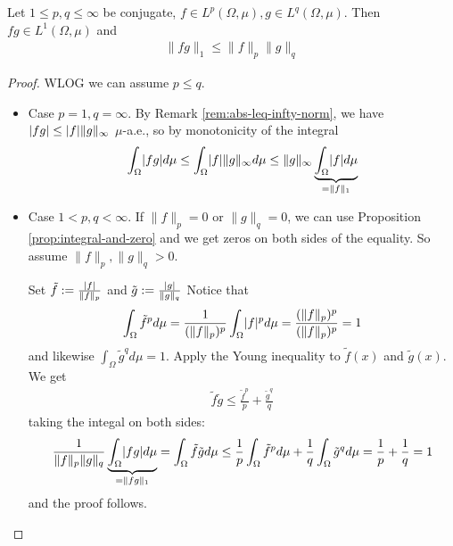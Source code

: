 \begin{cor}
  Let $1\leq p,q \leq \infty$ be conjugate, $f \in L^{p}(\Omega,\mu), g \in L^{q}(\Omega,\mu)$.
  Then $fg \in L^{1}(\Omega,\mu)$ and
  \begin{align*}
    \|fg\|_1 \leq \|f\|_p \|g\|_q
  \end{align*}
\end{cor}
\begin{proof}
WLOG we can assume $p \leq q$.
\begin{itemize}
  \item Case $p=1,q=\infty$. By Remark \ref{rem:abs-leq-infty-norm}, we have
    $\vert fg\vert \leq \vert f\vert \|g\|_{\infty}$ $\mu$-a.e., so by monotonicity of the integral
    \begin{align*}
    \int_{\Omega} \abs{fg} d \mu \leq \int_{\Omega} \abs{f} \|g\|_{\infty} d \mu \leq \|g\|_{\infty} \underbrace{\int_{\Omega} \abs{f} d \mu}_{=\|f\|_1}
    \end{align*}
  \item Case $1 < p,q < \infty$.
    If $\|f\|_p=0$ or $\|g\|_q=0$, we can use Proposition \ref{prop:integral-and-zero} and we get zeros on both sides of the equality.
    So assume $\|f\|_p, \|g\|_q > 0$.

    Set $\tilde{f} := \frac{\vert f\vert}{\|f\|_p}$ and $\tilde{g} := \frac{\vert g\vert}{\|g\|_q}$
    Notice that
    \begin{align*}
      \int_{\Omega} \tilde{f}^{p} d \mu  = \frac{1}{(\|f\|_p)^{p}}\int_{\Omega} \abs{f}^{p}d \mu = \frac{(\|f\|_p)^{p}}{(\|f\|_{p})^{p}} = 1
    \end{align*}
    and likewise $\int_{\Omega} \tilde{g}^{q} d \mu = 1$.
    Apply the Young inequality to $\tilde{f}(x)$ and $\tilde{g}(x)$. We get
    \begin{align*}
      \tilde{f} \tilde{g} \leq \frac{\tilde{f}^{p}}{p} + \frac{\tilde{g}^{q}}{q}
    \end{align*}
    taking the integal on both sides:
    \begin{align*}
      \frac{1}{\|f\|_p \|g\|_q} \underbrace{\int_{\Omega} \abs{fg} d \mu}_{=\|fg\|_1}
      =
      \int_{\Omega}
      \tilde{f} \tilde{g} d \mu \leq \frac{1}{p} \int_{\Omega} \tilde{f}^{p} d \mu + \frac{1}{q} \int_{\Omega} \tilde{g}^{q} d \mu
      = \frac{1}{p} + \frac{1}{q} = 1
    \end{align*}
    and the proof follows.
\end{itemize}
\end{proof}

